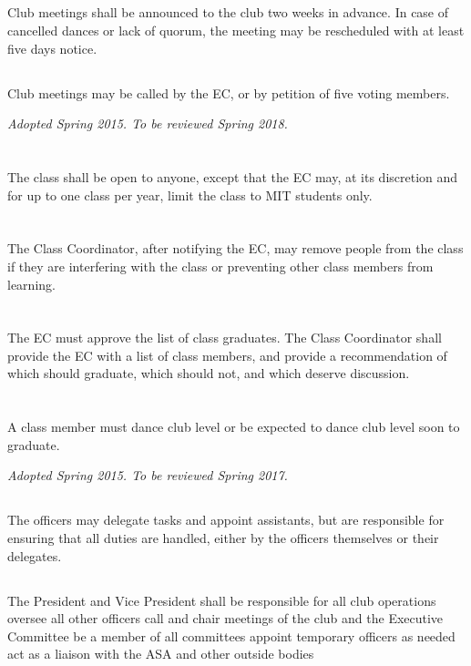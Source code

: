 \documentclass{bylaws}
\newcommand{\sptimes}[2]{\emph{Adopted #1. To be reviewed #2.}}
\begin{document}
\subsection{}Club meetings shall be announced to the club two weeks in advance. In case of cancelled dances or lack of quorum, the meeting may be rescheduled with at least five days notice.
\subsection{}Club meetings may be called by the EC, or by petition of five voting members.


\sptimes{Spring 2015}{Spring 2018}
\section{}The class shall be open to anyone, except that the EC may, at its discretion and for up to one class per year, limit the class to MIT students only.
\section{}The Class Coordinator, after notifying the EC, may remove people from the class if they are interfering with the class or preventing other class members from learning.
\section{}The EC must approve the list of class graduates. The Class Coordinator shall provide the EC with a list of class members, and provide a recommendation of which should graduate, which should not, and which deserve discussion.
\section{}A class member must dance club level or be expected to dance club level soon to graduate. 


\sptimes{Spring 2015}{Spring 2017}


\subsection{}The officers may delegate tasks and appoint assistants, but are responsible for ensuring that all duties are handled, either by the officers themselves or their delegates.

\subsection{}The President and Vice President shall
\duty be responsible for all club operations
\duty oversee all other officers
\duty call and chair meetings of the club and the Executive Committee
\duty be a member of all committees
\duty appoint temporary officers as needed
\duty act as a liaison with the ASA and other outside bodies
\end{document}
